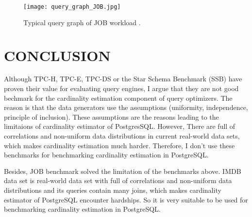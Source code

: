 \begin{figure}[H]
	\centering
	\texttt{[image: query\_graph\_JOB.jpg]}
	\caption{Typical query graph of JOB workload \cite{JOB}.}
\end{figure}

\section{CONCLUSION}

Although TPC-H, TPC-E, TPC-DS or the Star Schema Benchmark (SSB) have proven their value for evaluating query engines, I argue
that they are not good bechmark for the cardinality estimation component of query optimizers. The reason is that the data generators
use the assumptions (uniformity, independence, principle of inclusion). These assumptions are the reasons leading to the limitaions of
cardinality estimator of PostgresSQL. However, There are full of correlations and non-uniform data distributions in current real-world 
data sets, which makes cardinality estimation much harder. Therefore, I don't use these benchmarks for benchmarking cardinality estimation
in PostgreSQL.

Besides, JOB benchmark solved the limitation of the benchmarks above. IMDB data set is real-world data set with full of correlations and 
non-uniform data distributions and its queries contain many joins, which makes cardinality estimator of PostgreSQL encounter hardships. So 
it is very suitable to be used for benchmarking cardinality estimation in PostgreSQL.



